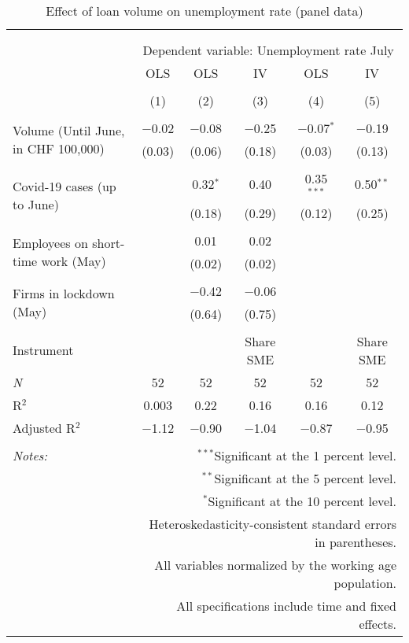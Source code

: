 
\begin{table}[!htbp] \centering 
  \caption{Effect of loan volume on unemployment rate (panel data)} 
  \label{tab:FEResults} 
\footnotesize 
\begin{tabular}{@{\extracolsep{5pt}}lccccc} 
\\[-1.8ex]\hline 
\hline \\[-1.8ex] 
\\[-1.8ex] & \multicolumn{5}{c}{Dependent variable: Unemployment rate July} \\ 
 & OLS & OLS & IV & OLS & IV \\ 
\\[-1.8ex] & (1) & (2) & (3) & (4) & (5)\\ 
\hline \\[-1.8ex] 
 \multirow{2}{4cm}{Volume (Until June, in CHF 100,000)} & $-$0.02 & $-$0.08 & $-$0.25 & $-$0.07$^{*}$ & $-$0.19 \\ 
  & (0.03) & (0.06) & (0.18) & (0.03) & (0.13) \\ 
  & & & & & \\ 
 \multirow{2}{4cm}{Covid-19 cases (up to June)} &  & 0.32$^{*}$ & 0.40 & 0.35$^{***}$ & 0.50$^{**}$ \\ 
  &  & (0.18) & (0.29) & (0.12) & (0.25) \\ 
  & & & & & \\ 
 \multirow{2}{4cm}{Employees on short-time work (May)} &  & 0.01 & 0.02 &  &  \\ 
  &  & (0.02) & (0.02) &  &  \\ 
  & & & & & \\ 
 \multirow{2}{4cm}{Firms in lockdown (May)} &  & $-$0.42 & $-$0.06 &  &  \\ 
  &  & (0.64) & (0.75) &  &  \\ 
  & & & & & \\ 
Instrument &  &  & Share SME &  & Share SME \\ 
\textit{N} & 52 & 52 & 52 & 52 & 52 \\ 
R$^{2}$ & 0.003 & 0.22 & 0.16 & 0.16 & 0.12 \\ 
Adjusted R$^{2}$ & $-$1.12 & $-$0.90 & $-$1.04 & $-$0.87 & $-$0.95 \\ 
\hline 
\hline \\[-1.8ex] 
\textit{Notes:} & \multicolumn{5}{r}{$^{***}$Significant at the 1 percent level.} \\ 
 & \multicolumn{5}{r}{$^{**}$Significant at the 5 percent level.} \\ 
 & \multicolumn{5}{r}{$^{*}$Significant at the 10 percent level.} \\ 
 & \multicolumn{5}{r}{Heteroskedasticity-consistent standard errors in parentheses.} \\ 
 & \multicolumn{5}{r}{All variables normalized by the working age population.} \\ 
 & \multicolumn{5}{r}{All specifications include time and fixed effects.} \\ 
\end{tabular} 
\end{table} 
